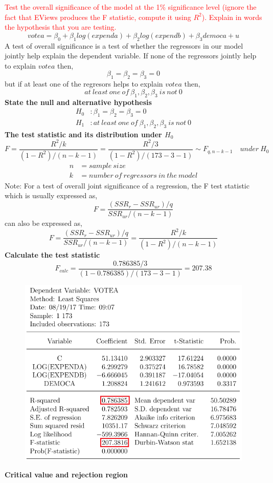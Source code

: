 \documentclass[12pt]{report}
\begin{document}
\noindent \textcolor{red}
{
	Test the overall significance of the model at the 1\% significance level (ignore the fact that EViews produces the F statistic, compute it using $R^2$). Explain in words the hypothesis that you are testing.
}
$$votea = \beta_0 + \beta_1log(expenda) + \beta_2log(expendb) + \beta_3democa + u $$
\noindent A test of overall significance is a test of whether the regressors in our model jointly help explain the dependent variable. If none of the regressors jointly help to explain $votea$ then,
$$\beta_1 = \beta_2 = \beta_3 = 0$$
but if at least one of the regresors helps to explain $votea$ then,
$$at\ least\ one\ of\ \beta_1, \beta_2, \beta_3\ is\ not\ 0$$
\noindent \textbf{State the null and alternative hypothesis}
\begin{align*}
	H_0&: \beta_1 = \beta_2 = \beta_3 = 0 \\
	H_1&: at\ least\ one\ of\ \beta_1, \beta_2, \beta_3\ is\ not\ 0
\end{align*}
\noindent \textbf{The test statistic and its distribution under $H_0$}
$$F = \dfrac{R^{2}/k}{(1-R^2)/(n-k-1)} = \dfrac{R^{2}/3}{(1-R^2)/(173-3-1)} \sim F_{q,n-k-1} \quad under\ H_0$$
\begin{align*}
	n &= sample\ size \\
	k &= number\ of\ regressors\ in\ the\ model  
\end{align*}
\noindent Note: For a test of overall joint significance of a regression, the F test statistic which is usually expressed as, $$F = \dfrac{(SSR_r - SSR_{ur})/q}{SSR_{ur}/(n-k-1)}$$ can also be expressed as,
$$F = \dfrac{(SSR_r - SSR_{ur})/q}{SSR_{ur}/(n-k-1)} = \dfrac{R^{2}/k}{(1-R^2)/(n-k-1)}$$
\noindent \textbf{Calculate the test statistic}
$$F_{calc} = \dfrac{0.786385/3}{(1-0.786385)/(173-3-1)} = 207.38 $$
\begin{figure}[H]
	\centering
	\includegraphics{q1_4}
\end{figure}
\vspace{-\baselineskip}
\noindent \textbf{Critical value and rejection region}
\end{document}
